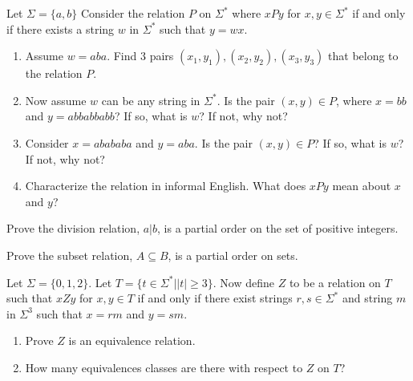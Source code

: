 \documentclass[]{exam}
\theoremstyle{definition}
\begin{document}
\begin{questions}
\question
Let $\Sigma = \{a,b\}$
Consider the relation $P$ on $\Sigma^*$ where $xPy$ for $x,y \in \Sigma^*$
if and only if there exists a string $w$ in $\Sigma^*$ such that $y = wx$. 
\begin{enumerate}[label=\alph*)]
\item Assume $w = aba$. Find $3$ pairs $(x_1,y_1),(x_2,y_2),(x_3,y_3)$ that belong
to the relation $P$.

\item Now assume $w$ can be any string in $\Sigma^*$. Is the pair $(x,y) \in P$,
where $x = bb$ and $y = abbabbabb$? If so, what is $w$? If not, why
not?

\item Consider $x = abababa$ and $y = aba$. Is the pair $(x,y) \in P$? If so,
what is $w$? If not, why not?

\item Characterize the relation in informal English. What does $xPy$ mean about $x$
and $y$?\\

\end{enumerate}
\question Prove the division relation, $a | b$, is a partial order on the set
of positive integers. 

\question Prove the subset relation, $A \subseteq B$, is a partial order on
sets. 

\question 
Let $\Sigma = \{0,1,2\}$.  Let $T = \{t \in \Sigma^* | |t| \geq 3\}$.
Now define $Z$ to be a relation on $T$ such that $xZy$ for $x,y \in
T$ if and only if there exist strings $r,s \in \Sigma^*$
and string $m$ in $\Sigma^3$ such that $x = rm$ and $y = sm$. 

\begin{enumerate}[label=\alph*)]
\item Prove $Z$ is an equivalence relation.

\item How many equivalences classes are there with respect to $Z$ on $T$?
\end{enumerate}


\end{questions}
\end{document}
